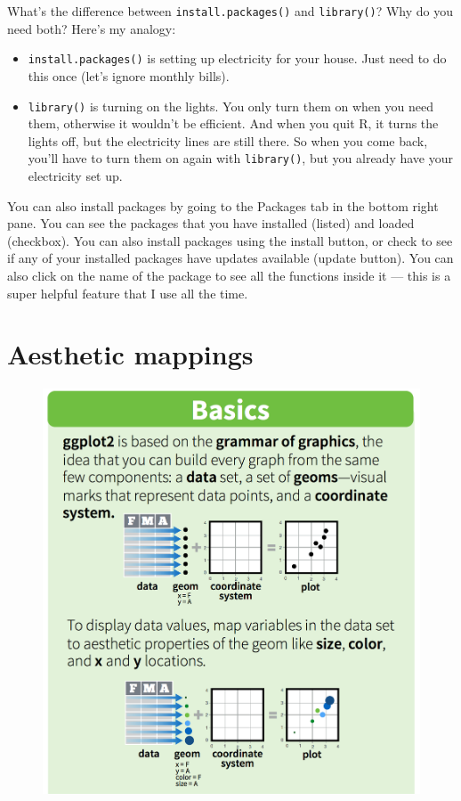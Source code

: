 \documentclass[]{book}
\providecommand{\tightlist}{%
  \setlength{\itemsep}{0pt}\setlength{\parskip}{0pt}}
\theoremstyle{definition}
\theoremstyle{definition}
\theoremstyle{definition}
\theoremstyle{remark}
\begin{document}
What's the difference between \texttt{install.packages()} and
\texttt{library()}? Why do you need both? Here's my analogy:

\begin{itemize}
\tightlist
\item
  \texttt{install.packages()} is setting up electricity for your house.
  Just need to do this once (let's ignore monthly bills).
\item
  \texttt{library()} is turning on the lights. You only turn them on
  when you need them, otherwise it wouldn't be efficient. And when you
  quit R, it turns the lights off, but the electricity lines are still
  there. So when you come back, you'll have to turn them on again with
  \texttt{library()}, but you already have your electricity set up.
\end{itemize}

You can also install packages by going to the Packages tab in the bottom
right pane. You can see the packages that you have installed (listed)
and loaded (checkbox). You can also install packages using the install
button, or check to see if any of your installed packages have updates
available (update button). You can also click on the name of the package
to see all the functions inside it --- this is a super helpful feature
that I use all the time.

\section{Aesthetic mappings}\label{aesthetic-mappings}

\begin{figure}[htbp]
\centering
\includegraphics{img/rstudio-cheatsheet-ggplot.png}
\caption{}
\end{figure}
\end{document}
